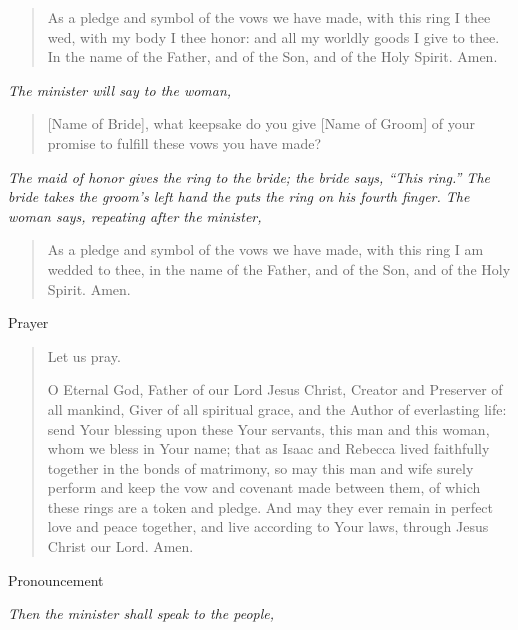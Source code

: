 \documentclass[
]{book}
\begin{document}
\begin{quote}
As a pledge and symbol of the vows we have made, with this ring I thee wed, with my body I thee honor: and all my worldly goods I give to thee. In the name of the Father, and of the Son, and of the Holy Spirit. Amen.
\end{quote}

\begin{center}
\emph{The minister will say to the woman,}

\end{center}

\begin{quote}
{[}Name of Bride{]}, what keepsake do you give {[}Name of Groom{]} of your promise to fulfill these vows you have made?
\end{quote}

\begin{center}
\emph{The maid of honor gives the ring to the bride; the bride says, ``This ring.'' The bride takes the groom's left hand the puts the ring on his fourth finger. The woman says, repeating after the minister,}

\end{center}

\begin{quote}
As a pledge and symbol of the vows we have made, with this ring I am wedded to thee, in the name of the Father, and of the Son, and of the Holy Spirit. Amen.
\end{quote}

Prayer

\begin{quote}
Let us pray.

O Eternal God, Father of our Lord Jesus Christ, Creator and Preserver of all mankind, Giver of all spiritual grace, and the Author of everlasting life: send Your blessing upon these Your servants, this man and this woman, whom we bless in Your name; that as Isaac and Rebecca lived faithfully together in the bonds of matrimony, so may this man and wife surely perform and keep the vow and covenant made between them, of which these rings are a token and pledge. And may they ever remain in perfect love and peace together, and live according to Your laws, through Jesus Christ our Lord. Amen.
\end{quote}

Pronouncement

\begin{center}
\emph{Then the minister shall speak to the people,}

\end{center}
\end{document}
